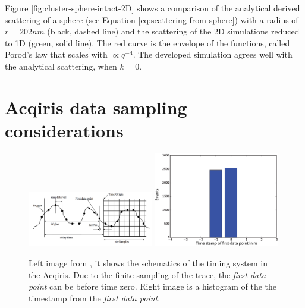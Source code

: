 Figure \ref{fig:cluster-sphere-intact-2D} shows a comparison of the analytical derived scattering of a sphere (see Equation \eqref{eq:scattering from sphere}) with a radius of $r=202nm$ (black, dashed line) and the scattering of the 2D simulations reduced to 1D (green, solid line). The red curve is the envelope of the functions, called Porod's law that scales with $\propto q^{-4}$. The developed simulation agrees well with the analytical scattering, when $k=0$.
%
%
%
\section{Acqiris data sampling considerations}\label{sec:acq-considerations}
\begin{figure}
	\centering
		\includegraphics[width=0.49\textwidth]{images/Acqiris-waveform-readout.png}
		\includegraphics[width=0.49\textwidth]{images/firstDataPoint.eps}
	\caption[First data point in Acqiris sampling.]{Left image from \citep{Acqiris-manual}, it shows the schematics of the timing system in the Acqiris. Due to the finite sampling of the trace, the \textit{first data point} can be before time zero. Right image is a histogram of the the timestamp from the \textit{first data point}.}
	\label{fig:Acqiris-waveform-readout}
\end{figure}
